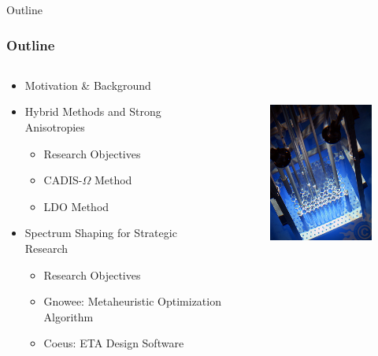 \documentclass[xcolor=x11names,compress]{beamer}
\renewcommand{\(}{\begin{columns}}
\renewcommand{\)}{\end{columns}}
\newcommand{\<}[1]{\begin{column}{#1}}
\renewcommand{\>}{\end{column}}
\begin{document}
\begin{frame}[fragile]{Outline}
  \frametitle{Outline}

\begin{columns}
  \begin{column}{0.5\textwidth}
    \begin{itemize}
    \item Motivation \& Background
    \vspace*{.5em}
    \item Hybrid Methods and Strong Anisotropies
        \begin{itemize}
        \item Research Objectives
	\item CADIS-$\Omega$ Method
	\item LDO Method
        \end{itemize}
        
   \vspace*{.5em}
   \item Spectrum Shaping for Strategic Research
        \begin{itemize}
        \item Research Objectives
	\item Gnowee: Metaheuristic Optimization Algorithm
	\item Coeus: ETA Design Software
        \end{itemize}	
  \end{itemize}
  \end{column}
  \begin{column}{0.5\textwidth}
  	\begin{figure}
  	\begin{center}
  		\includegraphics[height=2.5in,clip]{../figs/psu-reactor}
	\end{center}
  	\end{figure}
  \end{column}
\end{columns}

\end{frame}
\end{document}
